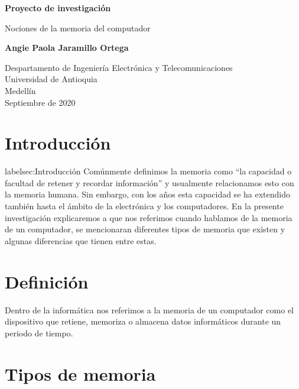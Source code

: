 \documentclass{article}
\begin{document}
\begin{titlepage}
    \begin{center}
        \vspace*{1cm}
            
        \Huge
        \textbf{Proyecto de investigación}
            
        \vspace{0.5cm}
        \LARGE
        Nociones de la memoria del computador
            
        \vspace{1.5cm}
            
        \textbf{Angie Paola Jaramillo Ortega}
            
        \vfill
            
        \vspace{0.8cm}
            
        \Large
        Despartamento de Ingeniería Electrónica y Telecomunicaciones\\
        Universidad de Antioquia\\
        Medellín\\
        Septiembre de 2020
            
    \end{center}
\end{titlepage}

\section{Introducción}label{sec:Introducción}
Comúnmente definimos la memoria como “la capacidad o facultad de retener y recordar información”\cite{definicion} y usualmente relacionamos esto con la memoria humana. Sin embargo, con los años esta capacidad se ha extendido también hasta el ámbito de la electrónica y los computadores. En la presente investigación explicaremos a que nos referimos cuando hablamos de la memoria de un computador, se mencionaran diferentes tipos de memoria que existen y algunas diferencias que tienen entre estas.


\section{Definición}
Dentro de la informática nos referimos a la memoria de un computador como el dispositivo que retiene, memoriza o almacena datos informáticos durante un periodo de tiempo.

\section{Tipos de memoria}
\end{document}
